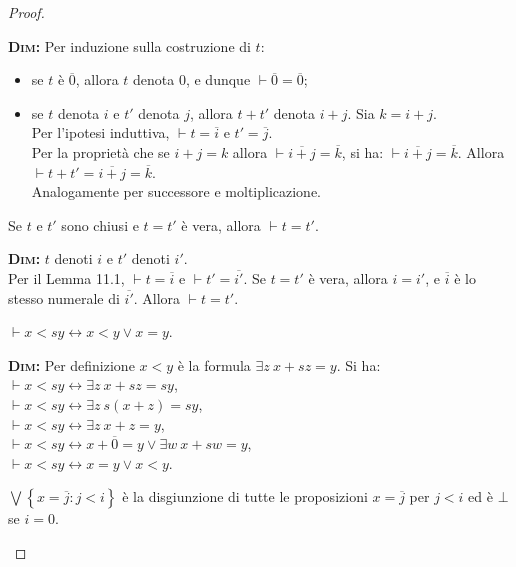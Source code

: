 \begin{proof}
\begin{description}
\textsc{\textbf{Dim:}} Per induzione sulla costruzione di $t$:
\begin{itemize}
	\item se $t$ è $\overline 0$, allora $t$ denota $0$, e dunque $\vdash \overline 0=\overline 0$;
	\item se $t$ denota $i$ e $t'$ denota $j$, allora $t+t'$ denota $i+j$. Sia $k=i+j$.\\
	Per l'ipotesi induttiva, $\vdash t=\overline i$ e $t'=\overline j$.\\
	Per la proprietà che se $i+j=k$ allora $\vdash \overline{i+j}=\overline k$, si ha: $\vdash \overline{i+j}=\overline k$. Allora $\vdash t+t'=\overline{i+j}=\overline k$.\\
	Analogamente per successore e moltiplicazione.\\
\end{itemize}

\begin{prop}
Se $t$ e $t'$ sono chiusi e $t=t'$ è vera, allora $\vdash t=t'$.
\end{prop}

\textsc{\textbf{Dim:}} $t$ denoti $i$ e $t'$ denoti $i'$.\\
Per il Lemma 11.1, $\vdash t=\overline i$ e $\vdash t'=\overline {i'}$. Se $t=t'$ è vera, allora $i=i'$, e $\overline i$ è lo stesso numerale di $\overline{i'}$. Allora $\vdash t=t'$.\\

\begin{lem}
$\vdash x<sy\leftrightarrow x<y \vee x=y$.
\end{lem}

\textsc{\textbf{Dim:}} Per definizione $x<y$ è la formula $\exists z\  x+sz=y$. Si ha:\\
$\vdash x<sy\leftrightarrow \exists z\ x+sz=sy$,\\
$\vdash x<sy\leftrightarrow \exists z\ s(x+z)=sy$,\\
$\vdash x<sy\leftrightarrow \exists z\ x+z=y$,\\
$\vdash x<sy\leftrightarrow x+\overline{0}=y \vee \exists w\ x+sw=y$,\\
$\vdash x<sy\leftrightarrow x=y \vee x<y$.\\

\begin{defi}
$\bigvee \left\{x=\overline j: j<i\right\}$ è la disgiunzione di tutte le proposizioni $x=\overline j$ per $j<i$ ed è $\bot$ se $i=0$.\\
\end{defi}


\end{description}
\end{proof}
